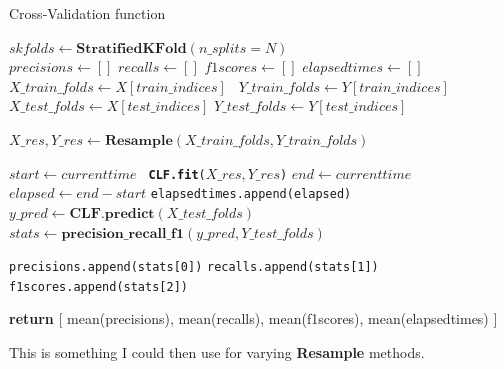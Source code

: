 \documentclass[12pt,a4paper,twoside]{report}
\begin{document}
\begin{algorithm}[H]
\caption{Cross-Validation function }\label{cross-val}
\begin{algorithmic}[1]

   \State $skfolds\gets \textbf{StratifiedKFold}(n\_splits = N)$\\
   
   \State $precisions\gets []$
   \State $recalls\gets []$
   \State $f1scores\gets []$
   \State $elapsedtimes\gets []$\\
   
        \State
         \texttt{\State $X\_train\_folds\gets X[train\_indices]$}
        \texttt{ \State $Y\_train\_folds\gets Y[train\_indices]$}
        \texttt{ \State $X\_test\_folds\gets X[test\_indices]$}
         \texttt{\State $Y\_test\_folds\gets Y[test\_indices]$}
         
         \texttt{\State $X\_res, Y\_res \gets \textbf{Resample}(X\_train\_folds,Y\_train\_folds)$}
         
          \texttt{\State $ start \gets current time$} 
          \texttt{ \State \textbf{CLF.fit}($X\_res, Y\_res$)} 
          \texttt{\State $ end \gets current time$} 
          \texttt{\State $ elapsed \gets end - start$} 
          \texttt{\State elapsedtimes.append(elapsed)} 
           \texttt{\State $y\_pred \gets \textbf{CLF.predict}(X\_test\_folds)$} 
          \texttt{\State $stats \gets \textbf{precision\_recall\_f1}(y\_pred, Y\_test\_folds )$} 
          
          \texttt{\State precisions.append(stats[0])}
          \texttt{\State recalls.append(stats[1])}  
          \texttt{\State f1scores.append(stats[2])} 
   \EndFor
   
   \State \textbf{return} [ mean(precisions), mean(recalls), mean(f1scores), mean(elapsedtimes) ]
   
\EndProcedure
\end{algorithmic}
\end{algorithm}

This is something I could then use for varying \textbf{Resample} methods. 
\end{document}

